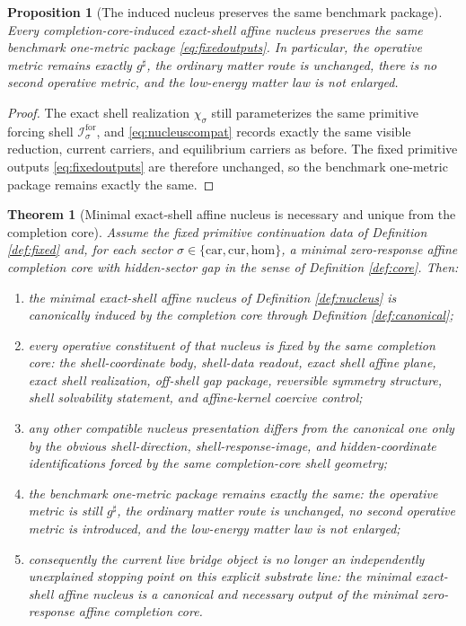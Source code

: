 \documentclass[11pt]{article}
\newcommand{\CompletedMetric}{g^{\sharp}}
\newcommand{\Car}{\mathrm{car}}
\newcommand{\Cur}{\mathrm{cur}}
\newcommand{\Hom}{\mathrm{hom}}
\newcommand{\ForSpace}[1]{\mathcal I_{#1}^{\mathrm{for}}}
\newcommand{\ShellEmbed}[1]{\chi_{#1}}
\newtheorem{proposition}{Proposition}
\newtheorem{theorem}{Theorem}
\begin{document}
\begin{proposition}[The induced nucleus preserves the same benchmark package]
\label{prop:benchmark}
Every completion-core-induced exact-shell affine nucleus preserves the same benchmark one-metric package \eqref{eq:fixedoutputs}. In particular, the operative metric remains exactly \(\CompletedMetric\), the ordinary matter route is unchanged, there is no second operative metric, and the low-energy matter law is not enlarged.
\end{proposition}

\begin{proof}
The exact shell realization \(\ShellEmbed{\sigma}\) still parameterizes the same primitive forcing shell \(\ForSpace{\sigma}\), and \eqref{eq:nucleuscompat} records exactly the same visible reduction, current carriers, and equilibrium carriers as before. The fixed primitive outputs \eqref{eq:fixedoutputs} are therefore unchanged, so the benchmark one-metric package remains exactly the same.
\end{proof}

\begin{theorem}[Minimal exact-shell affine nucleus is necessary and unique from the completion core]
\label{thm:main}
Assume the fixed primitive continuation data of Definition \ref{def:fixed} and, for each sector \(\sigma\in\{\Car,\Cur,\Hom\}\), a minimal zero-response affine completion core with hidden-sector gap in the sense of Definition \ref{def:core}. Then:
\begin{enumerate}
    \item the minimal exact-shell affine nucleus of Definition \ref{def:nucleus} is canonically induced by the completion core through Definition \ref{def:canonical};
    \item every operative constituent of that nucleus is fixed by the same completion core: the shell-coordinate body, shell-data readout, exact shell affine plane, exact shell realization, off-shell gap package, reversible symmetry structure, shell solvability statement, and affine-kernel coercive control;
    \item any other compatible nucleus presentation differs from the canonical one only by the obvious shell-direction, shell-response-image, and hidden-coordinate identifications forced by the same completion-core shell geometry;
    \item the benchmark one-metric package remains exactly the same: the operative metric is still \(\CompletedMetric\), the ordinary matter route is unchanged, no second operative metric is introduced, and the low-energy matter law is not enlarged;
    \item consequently the current live bridge object is no longer an independently unexplained stopping point on this explicit substrate line: the minimal exact-shell affine nucleus is a canonical and necessary output of the minimal zero-response affine completion core.
\end{enumerate}
\end{theorem}
\end{document}
